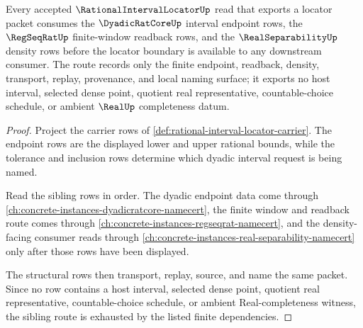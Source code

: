 \begin{theorem}
\label{thm:rational-interval-locator-sibling-route}
Every accepted $\RationalIntervalLocatorUp$ read that exports a locator packet consumes the $\DyadicRatCoreUp$ interval endpoint rows, the $\RegSeqRatUp$ finite-window readback rows, and the $\RealSeparabilityUp$ density rows before the locator boundary is available to any downstream consumer. The route records only the finite endpoint, readback, density, transport, replay, provenance, and local naming surface; it exports no host interval, selected dense point, quotient real representative, countable-choice schedule, or ambient $\RealUp$ completeness datum.
\end{theorem}
\begin{proof}
Project the carrier rows of \autoref{def:rational-interval-locator-carrier}. The endpoint rows are the displayed lower and upper rational bounds, while the tolerance and inclusion rows determine which dyadic interval request is being named.

Read the sibling rows in order. The dyadic endpoint data come through \autoref{ch:concrete-instances-dyadicratcore-namecert}, the finite window and readback route comes through \autoref{ch:concrete-instances-regseqrat-namecert}, and the density-facing consumer reads through \autoref{ch:concrete-instances-real-separability-namecert} only after those rows have been displayed.

The structural rows then transport, replay, source, and name the same packet. Since no row contains a host interval, selected dense point, quotient real representative, countable-choice schedule, or ambient Real-completeness witness, the sibling route is exhausted by the listed finite dependencies.
\end{proof}
